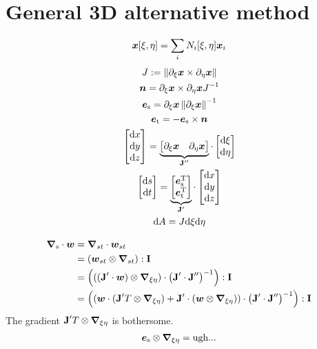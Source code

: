 \documentclass[a4paper,11pt]{article}
\newcommand{\ta}[1]{\text{\boldmath $#1$}} %
\newcommand{\ts}[1]{\text{\boldmath $\mathrm{#1}$}} %
\newcommand{\dif}[1]{\mathrm{d}#1}
\newcommand{\diff}{\ta{\nabla}}
\newcommand{\pderiv}[2]{\partial_{#2} #1}
\newcommand{\norm}[1]{\left\lVert{#1}\right\rVert}
\newcommand{\T}{\mathrm{T}}
\newcommand{\surf}{\mathrm{s}}
\newcommand{\tangent}{\mathrm{t}}
\newcommand{\defeq}{:=}
\begin{document}
\newpage
\section{General 3D alternative method}
\begin{align}
 \ta x[\xi,\eta] = \sum_i N_i[\xi,\eta]\ta x_i
\end{align}
\begin{gather}
 J \defeq \norm{\pderiv{\ta x}{\xi} \times  \pderiv{\ta x}{\eta}}\\
 \ta n = \pderiv{\ta x}{\xi} \times \pderiv{\ta x}{\eta} J^{-1}\\
 \ta e_\surf = \pderiv{\ta x}{\xi}\norm{\pderiv{\ta x}{\xi}}^{-1}\\
 \ta e_\tangent = -\ta e_\surf\times \ta n\\
 \begin{bmatrix}\dif x\\ \dif y\\ \dif z\end{bmatrix} =
  \underbrace{\begin{bmatrix}\pderiv{\ta x}{\xi} & \pderiv{\ta x}{\eta}
  \end{bmatrix}}_{\ts J''}
  \cdot \begin{bmatrix}\dif \xi \\ \dif \eta\end{bmatrix}\\
 \begin{bmatrix}\dif s\\ \dif t\end{bmatrix} =
  \underbrace{\begin{bmatrix} \ta e_\surf^\T \\ \ta e_\tangent^\T
  \end{bmatrix}}_{\ts J'}
  \cdot \begin{bmatrix}\dif x \\ \dif y \\ \dif z\end{bmatrix}\\
 \dif A = J \dif \xi \dif \eta
\end{gather}

\begin{align}
 \diff_\surf\cdot\ta w &= \diff_{st}\cdot\ta w_{st} \\
 &= (\ta w_{st}\otimes\diff_{st}):\ts I \\
 &= \left(((\ts J'\cdot \ta w) \otimes \diff_{\xi\eta})\cdot \left(\ts J'\cdot\ts J''\right)^{-1}\right): \ts I\\
 &= \left((\ta w\cdot (\ts J'^\T \otimes \diff_{\xi\eta}) +\ts J'\cdot(\ta w\otimes\diff_{\xi\eta}) )\cdot \left(\ts J'\cdot\ts J''\right)^{-1}\right): \ts I
\end{align}
The gradient $\ts J'^\T \otimes\diff_{\xi\eta}$ is bothersome.
\begin{align}
 \ta e_\surf \otimes \diff_{\xi\eta} = \text{ugh...}
\end{align}
\end{document}
